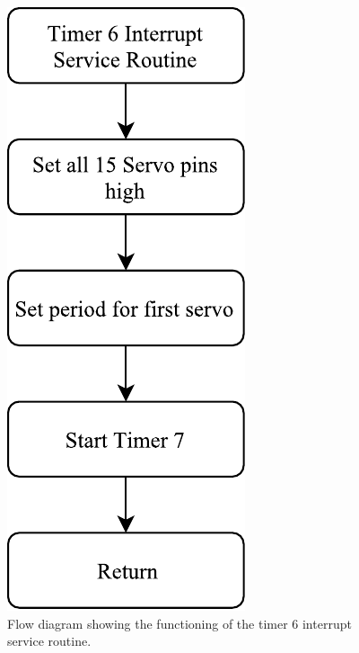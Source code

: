 \begin{figure}[H]
\centering
\includegraphics[scale = 1]{pics/Soft6.pdf}
\caption{Flow diagram showing the functioning of the timer 6 interrupt service routine.}
\label{fig:Soft6}
\end{figure}

